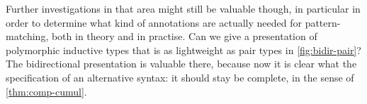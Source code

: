Further investigations in that area might still be valuable though, in particular in order
to determine what kind of annotations are actually needed for pattern-matching, both
in theory and in practise. Can we give a presentation of polymorphic inductive types
that is as lightweight as pair types in \cref{fig:bidir-pair}?
The bidirectional presentation is valuable there, because now
it is clear what the specification of an alternative syntax:
it should stay be complete, in the sense of \cref{thm:comp-cumul}.